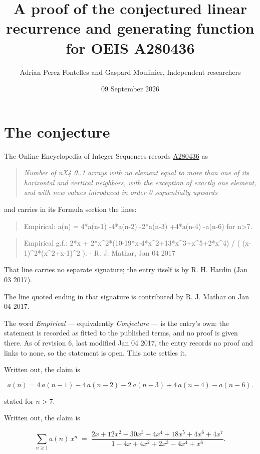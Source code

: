 \documentclass[11pt]{article}
\title{A proof of the conjectured linear recurrence and generating function for OEIS A280436}
\author{Adrian Perez Fontelles and Gaspard Moulinier, Independent researchers}
\date{09 September 2026}
\theoremstyle{definition}
\begin{document}
\maketitle
\section{The conjecture}

The Online Encyclopedia of Integer Sequences records \href{https://oeis.org/A280436}{A280436} as

\begin{quote}\itshape Number of nX4 0..1 arrays with no element equal to more than one of its horizontal and vertical neighbors, with the exception of exactly one element, and with new values introduced in order 0 sequentially upwards\end{quote}

and carries in its Formula section the lines:

\begin{quote}\ttfamily Empirical: a(n) = 4*a(n-1) -4*a(n-2) -2*a(n-3) +4*a(n-4) -a(n-6) for n>7.\end{quote}

\begin{quote}\ttfamily Empirical g.f.: 2*x + 2*x\textasciicircum{}2*(10-19*x-4*x\textasciicircum{}2+13*x\textasciicircum{}3+x\textasciicircum{}5+2*x\textasciicircum{}4) / ( (x-1)\textasciicircum{}2*(x\textasciicircum{}2+x-1)\textasciicircum{}2 ). - R. J. Mathar, Jan 04 2017\end{quote}

That line carries no separate signature; the entry itself is by R. H. Hardin (Jan 03 2017).

The line quoted ending in that signature is contributed by R. J. Mathar on Jan 04 2017.

The word {\itshape Empirical} --- equivalently {\itshape Conjecture} --- is the entry's own: the statement is recorded as fitted to the published terms, and no proof is given there. As of revision 6, last modified Jan 04 2017, the entry records no proof and links to none, so the statement is open. This note settles it.

Written out, the claim is

\[a(n) = 4\,a(n-1) - 4\,a(n-2) - 2\,a(n-3) + 4\,a(n-4) - a(n-6).\]

stated for $n > 7$.

Written out, the claim is

\[\sum_{n \ge 1} a(n)\,x^n \;=\; \frac{2x + 12x^{2} - 30x^{3} - 4x^{4} + 18x^{5} + 4x^{6} + 4x^{7}}{1 - 4x + 4x^{2} + 2x^{3} - 4x^{4} + x^{6}}.\]
\end{document}
